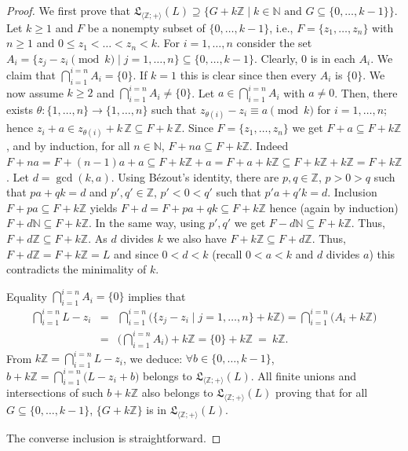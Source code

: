 \documentclass[11pt,a4paper]{article}
\theoremstyle{definition} %
\newcommand\+[1]{\mathcal{#1}} %
\newcommand{\N}{{\mathbb N}}     %
\newcommand{\Z}{{\mathbb Z}}     %
\newcommand{\Latt}{{\mathfrak{L}}}
\begin{document}
\begin{proof} 
We first prove that 
$\Latt_{\langle  \Z ;+\rangle}(L)\supseteq\{G+k\Z\mid k\in\N{\text{ and }}G\subseteq\{0,\ldots,k-1\}\}$.
Let $k\geq1$ and $F$ be a nonempty subset
of $\{0,\ldots,k-1\}$, i.e., $F=\{z_1,\ldots,z_n\}$ with $n\geq1$ and $0\leq z_1<\ldots<z_n<k$.
For $i=1,\ldots,n$ consider the set 
$A_i=\{z_j-z_i\pmod k\mid j=1,\ldots,n\}\subseteq\{0,\ldots,k-1\}$.
Clearly, $0$ is in each $A_i$.
We claim that $\bigcap_{i=1}^{i=n}A_i=\{0\}$.
 If $k=1$ this is clear since then every $A_i$ is $\{0\}$.
We now assume $k\geq2$ and $\bigcap_{i=1}^{i=n}A_i \neq \{0\}$. 
Let $a\in\bigcap_{i=1}^{i=n}A_i$ with $a\neq 0$.
Then, there exists $\theta:\{1,\ldots,n\}\to\{1,\ldots,n\}$ such that $z_{\theta(i)}-z_i\equiv a\pmod k$ for $i=1,\ldots,n$;
hence $z_i+a\in z_{\theta(i)}+k\,\Z\subseteq F+k\,\Z$.
Since $F=\{z_1,\ldots,z_n\}$ we get $F+a\subseteq F+k\Z$, and by induction, for all $n\in\N$, $F+na\subseteq F+k\Z$. Indeed $F+na=F+(n-1)a+a\subseteq  F+k\Z +a=F+a+k\Z\subseteq F+k\Z+k\Z=F+k\Z$.
Let $d=\gcd(k,a)$. 
Using B\'ezout's identity, there are  $p,q\in\Z$, $p>0>q$  such that 
$p a + q k=d$ and $p',q'\in\Z$, $p'<0<q'$  such that 
$p'a + q ' k=d$. Inclusion $F+p a\subseteq F+k\Z$ yields 
$F+d=F+p a+q k\subseteq F+k\Z$ hence (again by induction)  $F+d\N\subseteq F+k\Z$.
In the same way, using $p',q'$ we get $F-d\N\subseteq F+k\Z$.
Thus, $F+d\Z\subseteq F+k\Z$.
As $d$ divides $k$ we also have $F+k\Z\subseteq F+d\Z$.
Thus, $F+d\Z=F+k\Z=L$ and since $0<d<k$ (recall $0<a<k$ and $d$ divides $a$)
this contradicts the minimality of $k$.

Equality $\bigcap_{i=1}^{i=n}A_i=\{0\}$ implies that
\begin{eqnarray*}
\bigcap_{i=1}^{i=n} L-z_i &=& \bigcap_{i=1}^{i=n}\big( \{z_j-z_i\mid j=1,\ldots,n\}+k\Z\big)
= \bigcap_{i=1}^{i=n} \big(A_i+k\Z\big)\\
&=& \big(\bigcap_{i=1}^{i=n} A_i\big)+k\Z=
\{0\}+k\Z\ =\ k\Z.
\end{eqnarray*}
From $k\Z=\bigcap_{i=1}^{i=n} L-z_i$, we deduce:
 $\forall b\in \{0,\ldots,k-1\}$, $ b+k\Z= \bigcap_{i=1}^{i=n} \big(L-z_i+b\big)$ 
 belongs to $\Latt_{\langle  \Z ;+\rangle}(L)$. 
All finite unions and intersections of such $b+k\Z$ also belongs to  $\Latt_{\langle  \Z ;+\rangle}(L)$ proving that for all $G\subseteq\{0,\ldots,k-1\}$, 
 $\{G+k\Z\}$ is in  $\Latt_{\langle  \Z ;+\rangle}(L)$. 

The converse inclusion is straightforward. 

\smallskip


\end{proof}
\end{document}
